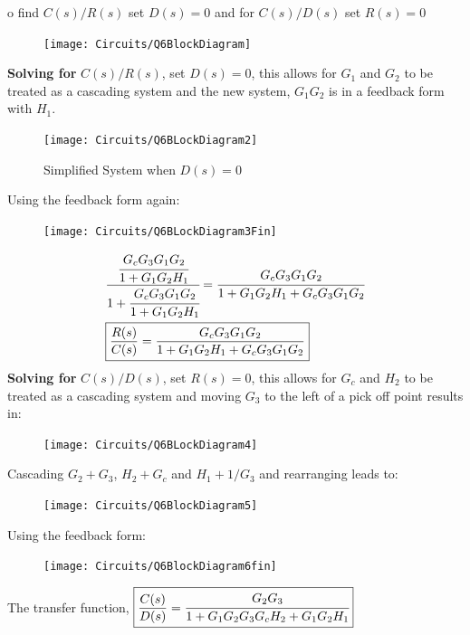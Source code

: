 \documentclass[12pt]{article}
\newenvironment{problem}[2][Problem]{\begin{trivlist}
		\item[\hskip \labelsep {\bfseries #1}\hskip \labelsep {\bfseries #2.}]}{\end{trivlist}}
\begin{document}
\nopagebreak
\begin{problem}[Problem 6 --- (B)-2-7 --- find C(s)/R(s) and C(s)/D(s)] 
To find $ C(s)/R(s)$ set $D(s)=0$ and  for $C(s)/D(s)$ set $R(s)=0$
\begin{figure}[H]
	\centering
	\texttt{[image: Circuits/Q6BlockDiagram]}
	\label{fig:q6blockdiagram}
\end{figure} 
\textbf{Solving for } $C(s)/R(s)$, set $D(s)=0$, this allows for $G_1$ and $G_2$ to be treated as a cascading system and the new system, $G_1G_2$ is in a feedback form with $H_1$. 
\begin{figure}[H]
	\centering
	\texttt{[image: Circuits/Q6BLockDiagram2]}
	\caption{Simplified System when $D(s)=0$}
	\label{fig:q6blockdiagram2}
\end{figure}
Using the feedback form again:
\begin{figure}[H]
	\centering
	\texttt{[image: Circuits/Q6BLockDiagram3Fin]}
	\label{fig:q6blockdiagram3fin}
\end{figure}
\vspace{-0.5cm}
\begin{align*}
& \cfrac{\cfrac{G_cG_3G_1G_2}{1+G_1G_2H_1}}{1+\cfrac{G_cG_3G_1G_2}{1+G_1G_2H_1}} = 
\cfrac{G_cG_3G_1G_2}{1+G_1G_2H_1+G_cG_3G_1G_2}\\
& \boxed{\frac{R(s)}{C(s)} = \frac{G_cG_3G_1G_2}{1+G_1G_2H_1+G_cG_3G_1G_2}}
\end{align*}
\textbf{Solving for } $C(s)/D(s)$, set $R(s)=0$, this allows for $G_c$ and $H_2$ to be treated as a cascading system and moving $G_3$ to the left of a pick off point results in:
\begin{figure}[H]
	\centering
	\texttt{[image: Circuits/Q6BLockDiagram4]}
	\label{fig:Q6BLockDiagram4}
\end{figure}
Cascading $G_2 + G_3$, $H_2 + G_c$ and $H_1+ 1 / G_3$ and rearranging leads to:
\begin{figure}[H]
	\centering
	\texttt{[image: Circuits/Q6BlockDiagram5]}
	\label{fig:q6blockdiagram5}
\end{figure}
Using the feedback form:
\begin{figure}[H]
	\centering
	\texttt{[image: Circuits/Q6BlockDiagram6fin]}
	\label{fig:q6blockdiagram6fin}
\end{figure}
The transfer function, $\displaystyle \boxed{\frac{C(s)}{D(s)}= \cfrac{G_2G_3}{1+G_1G_2G_3G_cH_2+G_1G_2H_1}}$
\end{problem}
\end{document}

